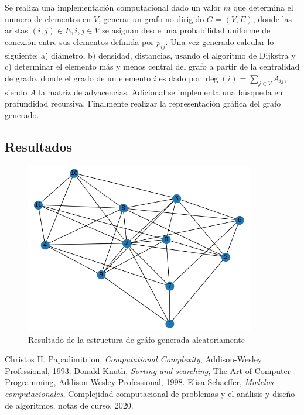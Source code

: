 \documentclass[letterpaper,11pt]{article}
\begin{document}
Se realiza una implementación computacional dado un valor $m$ que determina el numero de elementos en $V$, generar un grafo no dirigido $G=(V,E)$, donde las aristas $(i,j)\in E, i,j\in V$ se asignan desde una probabilidad uniforme de conexión entre sus elementos definida por $p_{ij}$. Una vez generado calcular lo siguiente: a) diámetro, b) densidad, distancias, usando el algoritmo de Dijkstra y c) determinar el elemento más y menos central del grafo a partir de la centralidad de grado, donde el grado de un elemento $i$ es dado por $\deg(i) = \sum_{j\in V} A_{ij}$, siendo $A$ la matriz de adyacencias. Adicional se implementa una búsqueda en profundidad recursiva. Finalmente realizar la representación gráfica del grafo generado.

\subsection{Resultados}

\begin{figure}[h]
 \centering
  \includegraphics[width=10cm]{out.png}
  \caption{Resultado de la estructura de gráfo generada aleatoriamente}
  \label{fig:bs}
\end{figure}

\begin{thebibliography}{0} 
   Christos H. Papadimitriou, \textit{Computational Complexity}, Addison-Wesley Professional, 1993.
   Donald Knuth, \textit{Sorting and searching}, The Art of Computer Programming, Addison-Wesley Professional, 1998.
   Elisa Schaeffer, \textit{Modelos computacionales}, Complejidad computacional de problemas y el análisis y diseño de algoritmos, notas de curso, 2020.
\end{thebibliography}
\end{document}
